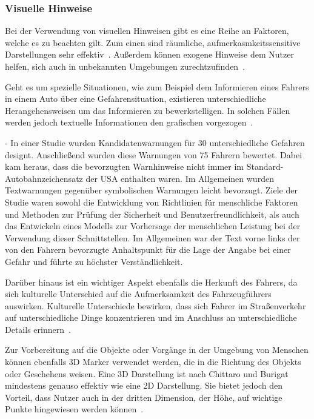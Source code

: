 \subsubsection{Visuelle Hinweise}


Bei der Verwendung von visuellen Hinweisen gibt es eine Reihe an Faktoren, welche es zu beachten gilt. Zum einen sind räumliche, aufmerkasmkeitssensitive Darstellungen sehr effektiv~\cite{bonanni2005attention}. Außerdem können exogene Hinweise dem Nutzer helfen, sich auch in unbekannten Umgebungen zurechtzufinden~\cite{bonanni2005attention}.

Geht es um spezielle Situationen, wie zum Beispiel dem Informieren eines Fahrers in einem Auto über eine Gefahrensituation, existieren unterschiedliche Herangehensweisen um das Informieren zu bewerkstelligen. In solchen Fällen werden jedoch textuelle Informationen den grafischen vorgezogen~\cite{green1995driver}.

-\cite{green1995driver} 
In einer Studie wurden Kandidatenwarnungen für 30 unterschiedliche Gefahren designt. Anschließend wurden diese Warnungen von 75 Fahrern bewertet. Dabei kam heraus, dass die bevorzugten Warnhinweise nicht immer im Standard-Autobahnzeichensatz der USA enthalten waren. Im Allgemeinen wurden Textwarnungen gegenüber symbolischen Warnungen leicht bevorzugt. Ziele der Studie waren sowohl die Entwicklung von Richtlinien für menschliche Faktoren und Methoden zur Prüfung der Sicherheit und Benutzerfreundlichkeit, als auch das Entwickeln eines Modells zur Vorhersage der menschlichen Leistung bei der Verwendung dieser Schnittstellen. Im Allgemeinen war der Text vorne links der von den Fahrern bevorzugte Anhaltspunkt für die Lage der Angabe bei einer Gefahr und führte zu höchster Verständlichkeit.

Darüber hinaus ist ein wichtiger Aspekt ebenfalls die Herkunft des Fahrers, da sich kulturelle Unterschied auf die Aufmerksamkeit des Fahrzeugführers auswirken.
Kulturelle Unterschiede bewirken, dass sich Fahrer im Straßenverkehr auf unterschiedliche Dinge konzentrieren und im Anschluss an unterschiedliche Details erinnern~\cite{shinohara2017visual}.

Zur Vorbereitung auf die Objekte oder Vorgänge in der Umgebung von Menschen können ebenfalls 3D Marker verwendet werden, die in die Richtung des Objekts oder Geschehens weisen. Eine 3D Darstellung ist nach Chittaro und Burigat mindestens genauso effektiv wie eine 2D Darstellung. Sie bietet jedoch den Vorteil, dass Nutzer auch in der dritten Dimension, der Höhe, auf wichtige Punkte hingewiesen werden können~\cite{chittaro20043d}.\\
